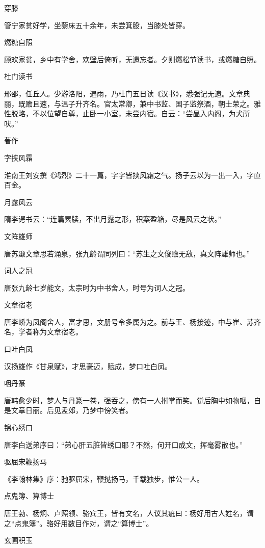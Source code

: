 \documentclass[a4paper,12pt,UTF8,twoside]{ctexbook}
\begin{document}
    穿膝
    
    管宁家贫好学，坐藜床五十余年，未尝箕股，当膝处皆穿。
    
    燃糖自照
    
    顾欢家贫，乡中有学舍，欢壁后倚听，无遗忘者。夕则燃松节读书，或燃糖自照。
    
    杜门读书
    
    邢邵，任丘人。少游洛阳，遇雨，乃杜门五日读《汉书》，悉强记无遗。文章典丽，既赡且速，与温子升齐名。官太常卿，兼中书监、国子监祭酒，朝士荣之。雅性脱略，不以位望自尊，止卧一小室，未尝内宿。自云：“尝昼入内阁，为犬所吠。”
    
    著作
    
    字挟风霜
    
    淮南王刘安撰《鸿烈》二十一篇，字字皆挟风霜之气。扬子云以为一出一入，字直百金。
    
    月露风云
    
    隋李谔书云：“连篇累牍，不出月露之形，积案盈箱，尽是风云之状。”
    
    文阵雄师
    
    唐苏颋文章思若涌泉，张九龄谓同列曰：“苏生之文俊赡无敌，真文阵雄师也。”
    
    词人之冠
    
    唐张九龄七岁能文，太宗时为中书舍人，时号为词人之冠。
    
    文章宿老
    
    唐李峤为凤阁舍人，富才思，文册号令多属为之。前与王、杨接迹，中与崔、苏齐名，学者称为文章宿老。
    
    口吐白凤
    
    汉扬雄作《甘泉赋》，才思豪迈，赋成，梦口吐白凤。
    
    咽丹篆
    
    唐韩愈少时，梦人与丹篆一卷，强吞之，傍有一人拊掌而笑。觉后胸中如物咽，自是文章日丽。后见孟郊，乃梦中傍笑者。
    
    锦心绣口
    
    唐李白送弟序曰：“弟心肝五脏皆绣口耶？不然，何开口成文，挥毫雾散也。”
    
    驱屈宋鞭扬马
    
    《李翰林集》序：驰驱屈宋，鞭挞扬马，千载独步，惟公一人。
    
    点鬼簿、算博士
    
    唐王勃、杨炯、卢照领、骆宾王，皆有文名，人议其疵曰：杨好用古人姓名，谓之“点鬼簿”。骆好用数目作对，谓之“算博士”。
    
    玄圃积玉
    
\end{document}
